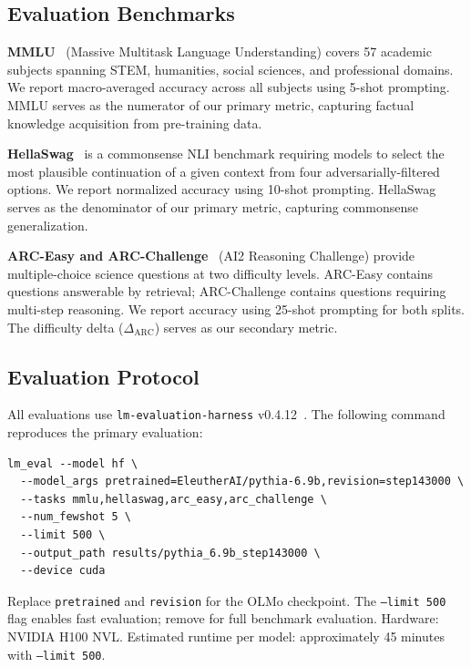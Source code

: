 \subsection{Evaluation Benchmarks}

\textbf{MMLU}~\cite{Hendrycks2021MMLU} (Massive Multitask Language Understanding) covers 57 academic subjects spanning STEM, humanities, social sciences, and professional domains. We report macro-averaged accuracy across all subjects using 5-shot prompting. MMLU serves as the numerator of our primary metric, capturing factual knowledge acquisition from pre-training data.

\textbf{HellaSwag}~\cite{Zellers2019HellaSwag} is a commonsense NLI benchmark requiring models to select the most plausible continuation of a given context from four adversarially-filtered options. We report normalized accuracy using 10-shot prompting. HellaSwag serves as the denominator of our primary metric, capturing commonsense generalization.

\textbf{ARC-Easy and ARC-Challenge}~\cite{Clark2018ARC} (AI2 Reasoning Challenge) provide multiple-choice science questions at two difficulty levels. ARC-Easy contains questions answerable by retrieval; ARC-Challenge contains questions requiring multi-step reasoning. We report accuracy using 25-shot prompting for both splits. The difficulty delta ($\Delta_{\text{ARC}}$) serves as our secondary metric.

\subsection{Evaluation Protocol}

All evaluations use \texttt{lm-evaluation-harness} v0.4.12~\cite{gao2024harness}. The following command reproduces the primary evaluation:

\begin{verbatim}
lm_eval --model hf \
  --model_args pretrained=EleutherAI/pythia-6.9b,revision=step143000 \
  --tasks mmlu,hellaswag,arc_easy,arc_challenge \
  --num_fewshot 5 \
  --limit 500 \
  --output_path results/pythia_6.9b_step143000 \
  --device cuda
\end{verbatim}

Replace \texttt{pretrained} and \texttt{revision} for the OLMo checkpoint. The \texttt{--limit 500} flag enables fast evaluation; remove for full benchmark evaluation. Hardware: NVIDIA H100 NVL. Estimated runtime per model: approximately 45 minutes with \texttt{--limit 500}.

